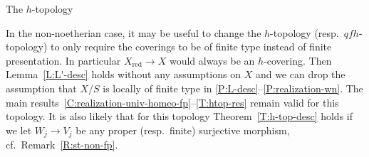 \documentclass[a4paper,twoside,11pt]{amsart}[2009/07/02] %
\newcommand{\pref}[1]{\eqref{#1}}
\newcommand{\red}{\mathrm{red}}
\begin{document}
\begin{section}{The $h$-topology}
\begin{remark}
In the non-noetherian case, it may be useful to change the $h$-topology (resp.\
$qfh$-topology) to only require the coverings to be of finite type instead of
finite presentation. In particular $X_\red\to X$ would always be an
$h$-covering.
%
Then Lemma~\pref{L:L'-desc} holds without any assumptions on $X$ and we can
drop the assumption that $X/S$ is locally of finite type in
\ref{P:L-desc}--\ref{P:realization-wn}. The main
results~\ref{C:realization-univ-homeo-fp}--\ref{T:htop-res} remain valid for
this topology.
%
It is also likely that for this topology
Theorem~\pref{T:h-top-desc} holds if we let $W_j\to V_j$ be
any proper (resp.\ finite) surjective morphism, cf.\ Remark~\pref{R:st-non-fp}.
%
\end{remark}

\end{section}
\end{document}
